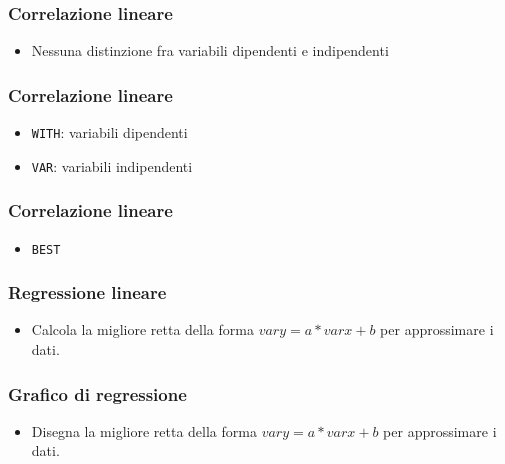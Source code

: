 

\begin{frame}[containsverbatim]\frametitle{Correlazione lineare}
  \begin{itemize}
  \item
    Nessuna distinzione fra variabili dipendenti e indipendenti
  \end{itemize}
\end{frame}


\begin{frame}[containsverbatim]\frametitle{Correlazione lineare}
  \begin{itemize}
  \item
    \verb!WITH!: variabili dipendenti
  \item
    \verb!VAR!: variabili indipendenti
  \end{itemize}
\end{frame}


\begin{frame}[containsverbatim]\frametitle{Correlazione lineare}
  \begin{itemize}
  \item
    \verb!BEST!
  \end{itemize}
\end{frame}





\begin{frame}[containsverbatim]\frametitle{Regressione lineare}
  \begin{itemize}
  \item
    Calcola la migliore retta della forma $vary=a*varx+b$ per approssimare
    i dati.
  \end{itemize}
\end{frame}

\begin{frame}[containsverbatim]\frametitle{Grafico di regressione}
  \begin{itemize}
  \item
    Disegna la migliore retta della forma $vary=a*varx+b$ per approssimare
    i dati.
  \end{itemize}
\end{frame}

